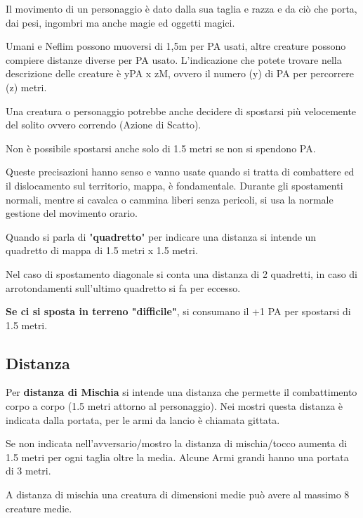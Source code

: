 \documentclass[12pt,a4paper,twoside,openany]{book}
\begin{document}
\begin{multicols}{2}

Il movimento di un personaggio è dato dalla sua taglia e razza e da ciò che porta, dai pesi, ingombri ma anche magie ed oggetti magici.

Umani e Neflim possono muoversi di 1,5m per PA usati, altre creature possono compiere distanze diverse per PA usato.
L'indicazione che potete trovare nella descrizione delle creature è yPA x zM, ovvero il numero (y) di PA per percorrere (z) metri.

Una creatura o personaggio potrebbe anche decidere di spostarsi più velocemente del solito ovvero correndo (Azione di Scatto).

Non è possibile spostarsi anche solo di 1.5 metri se non si spendono PA.

Queste precisazioni hanno senso e vanno usate quando si tratta di combattere ed il dislocamento sul territorio, mappa, è fondamentale. Durante gli spostamenti normali, mentre si cavalca o cammina liberi senza pericoli, si usa la normale gestione del movimento orario.

Quando si parla di "\textbf{quadretto}" per indicare una distanza si intende un quadretto di mappa di 1.5 metri x 1.5 metri.

Nel caso di spostamento diagonale si conta una distanza di 2 quadretti, in caso di arrotondamenti sull'ultimo quadretto si fa per eccesso.

\textbf{Se ci si sposta in terreno "difficile"}, si consumano il +1 PA per spostarsi di 1.5 metri.

\subsection{Distanza}\label{distanza}

Per \textbf{distanza di Mischia}  si intende una distanza che permette il combattimento corpo a corpo (1.5 metri attorno al personaggio). Nei mostri questa distanza è indicata dalla portata, per le armi da lancio è chiamata gittata.

Se non indicata nell'avversario/mostro la distanza di mischia/tocco aumenta di 1.5 metri per ogni taglia oltre la media.
Alcune Armi grandi hanno una portata di 3 metri.

A distanza di mischia una creatura di dimensioni medie può avere al massimo 8 creature medie.

\end{multicols}
\end{document}

